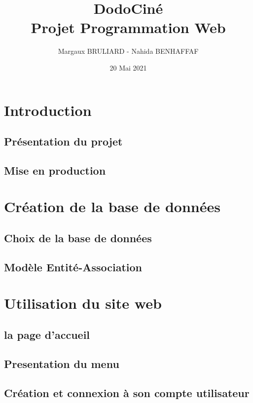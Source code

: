 \documentclass[a4paper, 11pt]{MyReport}
\author{Margaux BRULIARD - Nahida BENHAFFAF}
\title{DodoCiné \\ \vspace*{0.5cm}Projet Programmation Web}
\date{20 Mai 2021}
\begin{document}
	\begin{printTitle}
	\end{printTitle}

	\tableofcontents
	\newpage

	\chapter*{Introduction}
		
		\section*{Présentation du projet}

		\section*{Mise en production}


	\chapter{Création de la base de données}

		\section{Choix de la base de données}
			
		\section{Modèle Entité-Association}


	\chapter{Utilisation du site web}

		\section{la page d'accueil}

		\section{Presentation du menu}

		\section{Création et connexion à son compte utilisateur}

\end{document}
